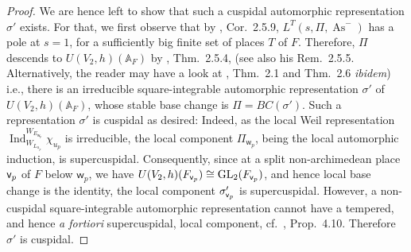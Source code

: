 \documentclass[a4paper,10pt]{amsart}
\theoremstyle{definition}
\numberwithin{equation}{section}
\def\A{\mathbb A}
\def\ww{\mathsf w}
\def\GL{{\rm GL}}
\def\vv{{\sf v}} %
\begin{document}
\begin{proof}
We are hence left to show that such a cuspidal automorphic representation $\sigma'$ exists. For that, we first observe that by \cite{mok}, Cor.\ 2.5.9, $L^T(s,\Pi,\operatorname{As}^{-})$ has a pole at $s=1$, for a sufficiently big finite set of places $T$ of $F$. Therefore, $\Pi$ descends to $U(V_2,h)(\A_F)$ by \cite{mok}, Thm.\ 2.5.4, (see also his Rem.\ 2.5.5. Alternatively, the reader may have a look at \cite{zou}, Thm.\ 2.1 and Thm.\ 2.6 {\it ibidem}) i.e., there is an irreducible square-integrable automorphic representation $\sigma'$ of $U(V_2,h)(\A_F)$, whose stable base change is $\Pi=BC(\sigma')$. Such a representation $\sigma'$ is cuspidal as desired: Indeed, as the local Weil representation $\operatorname{Ind}_{W_{L_{u_p}}}^{W_{E_{\ww_p}}}\chi_{u_p}$ is irreducible, the local component $\Pi_{\ww_p}$, being the local automorphic induction, is supercuspidal. Consequently, since at a split non-archimedean place \(\vv_p\) of \(F\) below \(\ww_p\), we have $U(V_2,h)(F_{\vv_p})\cong \GL_2(F_{\vv_p})$, and hence local base change is the identity, the local component \(\sigma'_{\vv_p}\) is supercuspidal. However, a non-cuspidal square-integrable automorphic representation cannot have a tempered, and hence {\it a fortiori} supercuspidal, local component, cf.\ \cite{clozel2}, Prop.\ 4.10. Therefore \(\sigma'\) is cuspidal.  
\end{proof}
\end{document}
